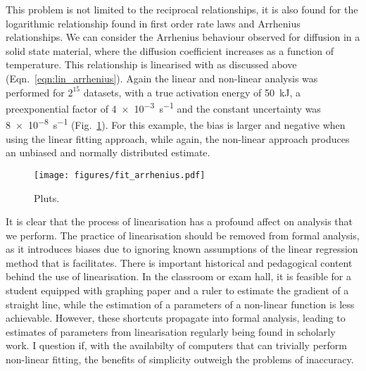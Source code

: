 \documentclass[reprint,superscriptaddress,nobibnotes,amsmath,amssymb]{revtex4-2}
\begin{document}
This problem is not limited to the reciprocal relationships, it is also found for the logarithmic relationship found in first order rate laws and Arrhenius relationships. 
We can consider the Arrhenius behaviour observed for diffusion in a solid state material, where the diffusion coefficient increases as a function of temperature. 
This relationship is linearised with as discussed above (Eqn.~\ref{eqn:lin_arrhenius}). 
Again the linear and non-linear analysis was performed for $2^{15}$ datasets, with a true activation energy of \SI{50}{\kilo\joule}, a preexponential factor of \SI{4e-3}{\second^{-1}} and the constant uncertainty was \SI{8e-8}{\second^{-1}} (Fig.~\ref{fig:fit_arrhenius}).
For this example, the bias is larger and negative when using the linear fitting approach, while again, the non-linear approach produces an unbiased and normally distributed estimate. 
%
\begin{figure}
  \texttt{[image: figures/fit\_arrhenius.pdf]}
  \caption{
    Pluts.
    }
  \label{fig:fit_arrhenius}
\end{figure}
%

It is clear that the process of linearisation has a profound affect on analysis that we perform. 
The practice of linearisation should be removed from formal analysis, as it introduces biases due to ignoring known assumptions of the linear regression method that is facilitates. 
There is important historical and pedagogical content behind the use of linearisation. 
In the classroom or exam hall, it is feasible for a student equipped with graphing paper and a ruler to estimate the gradient of a straight line, while the estimation of a parameters of a non-linear function is less achievable. 
However, these shortcuts propagate into formal analysis, leading to estimates of parameters from linearisation regularly being found in scholarly work. 
I question if, with the availabilty of computers that can trivially perform non-linear fitting, the benefits of simplicity outweigh the problems of inaccuracy.



\end{document}
